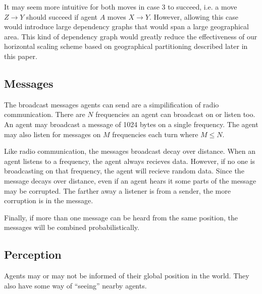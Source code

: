 It may seem more intuitive for both moves in case 3 to succeed, i.e. a move $Z\rightarrow Y$ should
succeed if agent $A$ moves $X\rightarrow Y$. However, allowing this case would introduce large
dependency graphs that would span a large geographical area. This kind of dependency graph would
greatly reduce the effectiveness of our horizontal scaling scheme based on geographical partitioning
described later in this paper.

\subsection{Messages}

The broadcast messages agents can send are a simpilification of radio communication. There are $N$
frequencies an agent can broadcast on or listen too. An agent may broadcast a message of 1024 bytes
on a single frequency. The agent may also listen for messages on $M$ frequencies each turn where $M
\leq N$.

Like radio communication, the messages broadcast decay over distance. When an agent listens to a
frequency, the agent always recieves data. However, if no one is broadcasting on that frequency, the
agent will recieve random data. Since the message decays over distance, even if an agent hears it
some parts of the message may be corrupted. The farther away a listener is from a sender, the more
corruption is in the message.

Finally, if more than one message can be heard from the same position, the messages will be combined
probabilistically.


\subsection{Perception}

Agents may or may not be informed of their global position in the world. They also have some way of
``seeing'' nearby agents.

